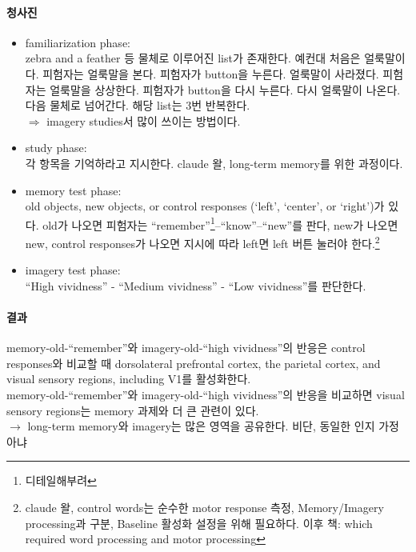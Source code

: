 \documentclass[../note.tex]{subfiles}
\begin{document}
{  \paragraph{청사진}
  \begin{itemize}
    \item familiarization phase:\\
      zebra and a feather 등 물체로 이루어진 list가 존재한다. 예컨대 처음은 얼룩말이다.
      피험자는 얼룩말을 본다. 피험자가 button을 누른다. 얼룩말이 사라졌다. 피험자는 얼룩말을 상상한다.
      피험자가 button을 다시 누른다. 다시 얼룩말이 나온다. 다음 물체로 넘어간다. 해당 list는 3번 반복한다.\\
      $\Rightarrow$ imagery studies서 많이 쓰이는 방법이다.
    \item study phase:\\
      각 항목을 기억하라고 지시한다. claude 왈, long-term memory를 위한 과정이다.
    \item memory test phase:\\
      old objects, new objects, or control responses (`left', `center', or `right')가 있다.
      old가 나오면 피험자는 ``remember''\footnote{디테일해부려}–``know''–``new''를 판다, new가 나오면 new, control responses가 나오면 지시에 따라 left면 left 버튼 눌러야 한다.\footnote{claude 왈, control words는 순수한 motor response 측정,
Memory/Imagery processing과 구분,
Baseline 활성화 설정을 위해 필요하다. 이후 책: which required word processing and motor processing
}
    \item imagery test phase:\\
      ``High vividness'' - ``Medium vividness'' - ``Low vividness''를 판단한다.
  \end{itemize}

  \paragraph{결과}
  memory-old-``remember''와 imagery-old-``high vividness''의 반응은 control responses와 비교할 때 dorsolateral prefrontal cortex, the parietal cortex, and visual sensory regions, including V1를 활성화한다.\\
  memory-old-``remember''와 imagery-old-``high vividness''의 반응을 비교하면 visual sensory regions는 memory 과제와 더 큰 관련이 있다.\\
  $\longrightarrow$ long-term memory와 imagery는 많은 영역을 공유한다. 비단, 동일한 인지 가정 아냐
  
}
\end{document}
